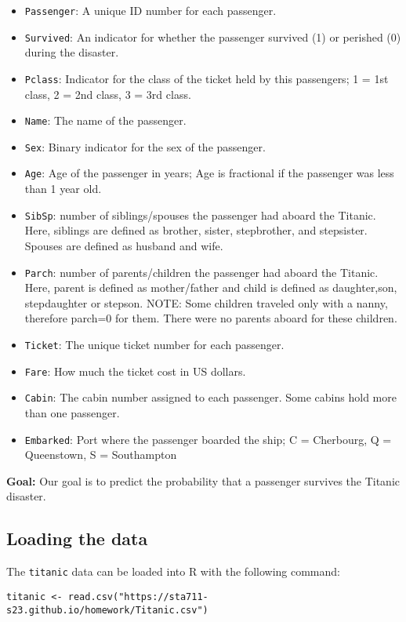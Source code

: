 \documentclass[11pt]{article}
\begin{document}
\begin{itemize}
\item \verb;Passenger;: A unique ID number for each passenger.
\item \verb;Survived;: An indicator for whether the passenger survived (1) or perished (0) during the disaster.
\item \verb;Pclass;: Indicator for the class of the ticket held by this passengers; 1 = 1st class, 2 = 2nd class, 3 = 3rd class.
\item \verb;Name;: The name of the passenger.
\item \verb;Sex;: Binary indicator for the sex of the passenger.
\item \verb;Age;: Age of the passenger in years; Age is fractional if the passenger was less than 1 year old.
\item \verb;SibSp;: number of siblings/spouses the passenger had aboard the Titanic. Here, siblings are defined as brother, sister, stepbrother, and stepsister. Spouses are defined as husband and wife.
\item \verb;Parch;: number of parents/children the passenger had aboard the Titanic. Here, parent is defined as mother/father and child is defined as daughter,son, stepdaughter or stepson. NOTE: Some children traveled only with a nanny, therefore parch=0 for them. There were no parents aboard for these children.
\item \verb;Ticket;: The unique ticket number for each passenger.
\item \verb;Fare;: How much the ticket cost in US dollars.
\item \verb;Cabin;: The cabin number assigned to each passenger. Some cabins hold more than one passenger.
\item \verb;Embarked;: Port where the passenger boarded the ship; C = Cherbourg, Q = Queenstown, S = Southampton
\end{itemize}

\noindent \textbf{Goal:} Our goal is to predict the probability that a passenger survives the Titanic disaster.

\subsection*{Loading the data}

The \verb;titanic; data can be loaded into R with the following command:

\begin{verbatim}
titanic <- read.csv("https://sta711-s23.github.io/homework/Titanic.csv")
\end{verbatim}
\end{document}
